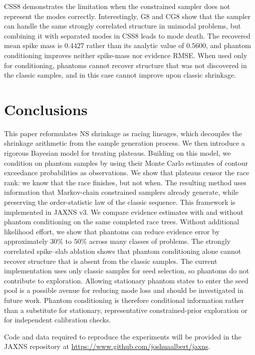 \documentclass[pdflatex,sn-basic,icol]{sn-jnl}
\theoremstyle{plain}
\theoremstyle{definition}
\begin{document}
CSS8 demonstrates the limitation when the constrained sampler does not represent the modes correctly.
Interestingly, G8 and CG8 show that the sampler can handle the same strongly correlated structure in unimodal problems, but combining it with separated modes in CSS8 leads to mode death.
The recovered mean spike mass is $0.4427$ rather than its analytic value of $0.5600$, and phantom conditioning improves neither spike-mass nor evidence RMSE.
When used only for conditioning, phantoms cannot recover structure that was not discovered in the classic samples, and in this case cannot improve upon classic shrinkage.

\section{Conclusions}\label{sec:conclusion}

This paper reformulates NS shrinkage as racing lineages, which decouples the shrinkage arithmetic from the sample generation process.
We then introduce a rigorous Bayesian model for treating plateaus.
Building on this model, we condition on phantom samples by using their Monte Carlo estimates of contour exceedance probabilities as observations.
We show that plateaus censor the race rank: we know that the race finishes, but not when.
The resulting method uses information that Markov-chain constrained samplers already generate, while preserving the order-statistic law of the classic sequence.
This framework is implemented in JAXNS v3.
We compare evidence estimates with and without phantom conditioning on the same completed race trees.
Without additional likelihood effort, we show that phantoms can reduce evidence error by approximately $30\%$ to $50\%$ across many classes of problems.
The strongly correlated spike--slab ablation shows that phantom conditioning alone cannot recover structure that is absent from the classic samples.
The current implementation uses only classic samples for seed selection, so phantoms do not contribute to exploration.
Allowing stationary phantom states to enter the seed pool is a possible avenue for reducing mode loss and should be investigated in future work.
Phantom conditioning is therefore conditional information rather than a
substitute for stationary, representative constrained-prior exploration or
for independent calibration checks.

\backmatter


Code and data required to reproduce the experiments will be provided in the JAXNS repository at \url{https://www.github.com/joshuaalbert/jaxns}.
\end{document}
